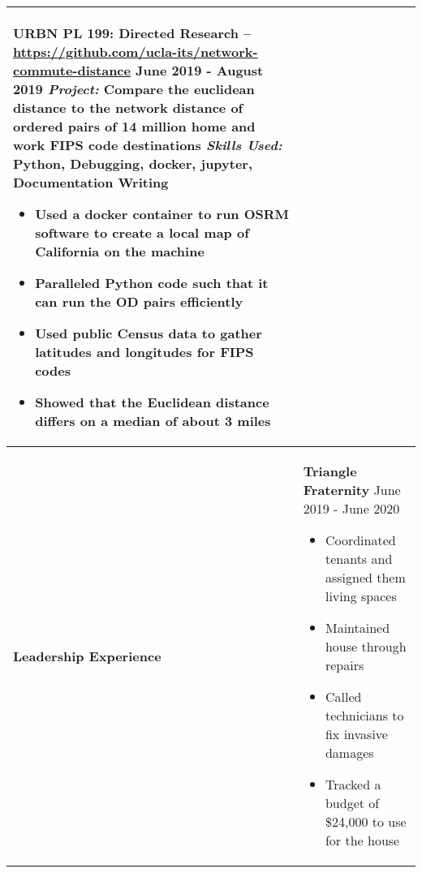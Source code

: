 \documentclass[10pt]{article}
\newcommand*\leftright[2]{%
  \leavevmode
  \rlap{#1}%
  \hspace{0.5\linewidth}%
  #2}
\begin{document}
\begin{longtable}{l l l l}
{        \textbf{URBN PL 199: Directed Research -- 
        \href{https://github.com/ucla-its/network-commute-distance}{https://github.com/ucla-its/network-commute-distance}} \newline
        \leftright{\textit{Advisor:} Evelyn Blumenberg}{June 2019 - August 2019} \newline
        \textit{Project:} Compare the euclidean distance to the network distance of ordered pairs of 14 million home and work FIPS code destinations \newline
        \textit{Skills Used:} Python, Debugging, docker, jupyter, Documentation Writing
        \begin{itemize}[noitemsep,nolistsep]
            \item Used a docker container to run OSRM software to create a local map of California on the machine
            \item Paralleled Python code such that it can run the OD pairs efficiently
            \item Used public Census data to gather latitudes and longitudes for FIPS codes
            \item Showed that the Euclidean distance differs on a median of about 3 miles
        \end{itemize}
        
        \baselineskip} \\ \hline
    \multicolumn{1}{p{2 cm}}{\textbf{Leadership \newline Experience}}  &
        \multicolumn{3}{p{16cm}}{
        \textbf{Triangle Fraternity} \newline
        \leftright{\textit{House Manager}}{June 2019 - June 2020}
        \begin{itemize}[noitemsep,nolistsep]
            \item Coordinated tenants and assigned them living spaces
            \item Maintained house through repairs
            \item Called technicians to fix invasive damages
            \item Tracked a budget of \$24,000 to use for the house
        \end{itemize}
        
}
\end{longtable}
\end{document}
